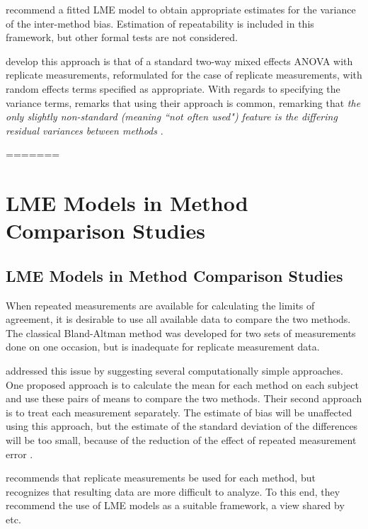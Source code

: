 \documentclass[12pt, a4paper]{report}
\theoremstyle{plain}
\theoremstyle{definition}
\theoremstyle{remark}
\begin{document}
\citet{BXC2008} recommend a fitted LME model to obtain appropriate estimates for the variance of the inter-method bias.  Estimation of repeatability is included in this framework, but other formal tests are not considered.
	
\citet{BXC2008} develop this approach is that of a standard two-way mixed effects ANOVA with replicate measurements, reformulated for the case of replicate measurements, with random effects terms specified as appropriate. With regards to specifying the variance terms, \citet{BXC2008} remarks that using their approach is common, remarking that \emph{the only slightly non-standard (meaning ``not often used") feature is the differing residual variances between methods }\citep{BXC2010}.
	
	
	
=======
\chapter{LME Models in Method Comparison Studies}

\section{LME Models in Method Comparison Studies}

When repeated measurements are available for calculating the limits of agreement, it is desirable to use all available data to compare the two methods. The classical Bland-Altman method was developed for two sets of measurements done on one occasion, but is inadequate for replicate measurement data.

\citet{BA99} addressed this issue by suggesting several computationally simple approaches.  One proposed approach is to calculate the mean for each method on each subject and use these pairs of means to compare the two methods. Their second approach is to treat each measurement separately.
The estimate of bias will be unaffected using this approach, but the estimate of the standard deviation of the differences will be too small, because of the reduction of the effect of repeated measurement error \citep{BXC2004,BXC2008}.

\citet{BXC2008} recommends that replicate measurements be used for each method, but recognizes that resulting data are more difficult to analyze. To this end, they recommend the use of LME models as a suitable framework, a view shared by \citet{ARoy2009} etc.
\end{document}
